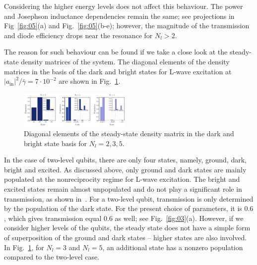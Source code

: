 \documentclass[lettersize,journal]{IEEEtran}
\begin{document}
Considering the higher energy levels does not affect this behaviour.
The power and Josephson inductance dependencies remain the same; see projections in Fig~\ref{fig:05}(a) and Fig.~\ref{fig:05}(b-e); however, the magnitude of the transmission and diode efficiency drops near the resonance for $N_l > 2$.

The reason for such behaviour can be found if we take a close look at the steady-state density matrices of the system.
The diagonal elements of the density matrices in the basis of the dark and bright states for L-wave excitation at $|a_\mathrm{in}|^2 / \bar{\gamma} = 7 \cdot 10^{-2}$ are shown in Fig.~\ref{fig:04}.
\begin{figure}[h!]
    \centering
    \includegraphics[width=0.48\textwidth]{fig_7}
    \caption{Diagonal elements of the steady-state density matrix in the dark and bright state basis for $N_l = 2, 3, 5$.}
    \label{fig:04}
\end{figure}
In the case of two-level qubits, there are only four states, namely, ground, dark, bright and excited.
As discussed above, only ground and dark states are mainly populated at the nonreciprocity regime for L-wave excitation.
The bright and excited states remain almost unpopulated and do not play a significant role in transmission, as shown in~\cite{muller_nonreciprocal_2017}.
For a two-level qubit, transmission is only determined by the population of the dark state. 
For the present choice of parameters, it is $0.6$, which gives transmission equal $0.6$ as well; see Fig.~\ref{fig:03}(a).
However, if we consider higher levels of the qubits, the steady state does not have a simple form of superposition of the ground and dark states -- higher states are also involved.
In Fig.~\ref{fig:04}, for $N_l = 3$ and $N_l = 5$, an additional state has a nonzero population compared to the two-level case.
\end{document}

